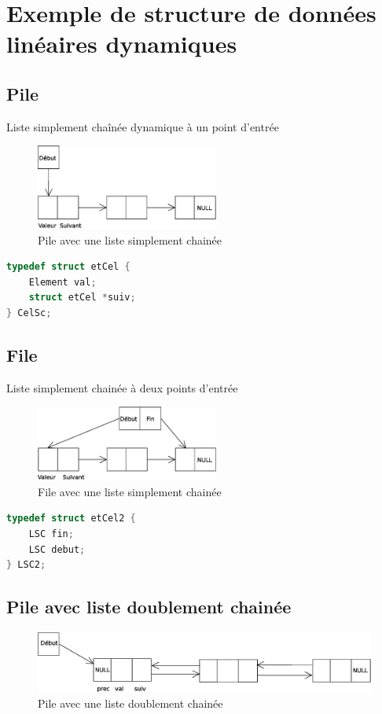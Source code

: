 \section{Exemple de structure de données linéaires dynamiques}
\subsection{Pile}
Liste simplement chaînée dynamique à un point d'entrée

\begin{figure}[H]
	\centering
	\includegraphics[width=6cm]{content/pile.eps}
	\caption{Pile avec une liste simplement chainée}
\end{figure}

\begin{lstlisting}[language=C, numbers=none,frame=none]
	typedef struct etCel {
	Element val;
	struct etCel *suiv;
} CelSc;
\end{lstlisting}

\subsection{File}
Liste simplement chainée à deux points d'entrée

\begin{figure}[H]
	\centering
\includegraphics[width=6cm]{content/file.eps}
	\caption{File avec une liste simplement chainée}
\end{figure}
\begin{lstlisting}[language=C, numbers=none,frame=none]
	typedef struct etCel2 {
	LSC fin;
	LSC debut;
} LSC2;
\end{lstlisting}
\subsection{Pile avec liste doublement chainée}
\begin{figure}[H]
	\centering
\includegraphics[width=12cm]{content/pileDoubleChaine.eps}
	\caption{Pile avec une liste doublement chainée}
\end{figure}

